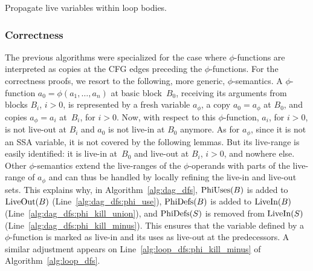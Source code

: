 \begin{algorithm}[H]
  \caption{Propagate live variables within loop bodies.}
  \label{alg:loop_dfs}
\end{algorithm}

\subsubsection{Correctness}
\label{sec:correctnessdebase}

The previous algorithms were specialized for the case where $\phi$-functions are interpreted as copies at the CFG edges preceding the $\phi$-functions.
For the correctness proofs, we resort to the following, more generic, $\phi$-semantics.
A $\phi$-function $a_0 = \phi(a_1, \ldots, a_n)$ at basic block~$B_0$, receiving its arguments from blocks $B_i$, $i>0$, is represented by a fresh variable $a_{\phi}$, a copy $a_0 = a_{\phi}$ at $B_0$, and copies $a_{\phi} = a_i$ at~$B_i$, for $i>0$.
Now, with respect to this $\phi$-function, $a_i$, for $i>0$, is not live-out at $B_i$ and $a_0$ is not live-in at $B_0$ anymore.
As for $a_{\phi}$, since it is not an SSA variable, it is not covered by the following lemmas.
But its live-range is easily identified:
it is live-in at~$B_0$ and live-out at $B_i$, $i>0$, and nowhere else.
Other $\phi$-semantics extend the live-ranges of the $\phi$-operands with parts of the live-range of $a_{\phi}$ and can thus be handled by locally refining the live-in and live-out sets.
This explains why, in Algorithm~\ref{alg:dag_dfs}, $\textrm{PhiUses}(B)$ is added to $\textrm{LiveOut}(B)$ (Line~\ref{alg:dag_dfs:phi_use}), $\textrm{PhiDefs}(B)$ is added to $\textrm{LiveIn}(B)$ (Line~\ref{alg:dag_dfs:phi_kill_union}), and $\textrm{PhiDefs}(S)$ is removed from $\textrm{LiveIn}(S)$ (Line~\ref{alg:dag_dfs:phi_kill_minus}).
This ensures that the variable defined by a $\phi$-function is marked as live-in and its uses as live-out at the predecessors.
A similar adjustment appears on Line~\ref{alg:loop_dfs:phi_kill_minus} of Algorithm~\ref{alg:loop_dfs}.

